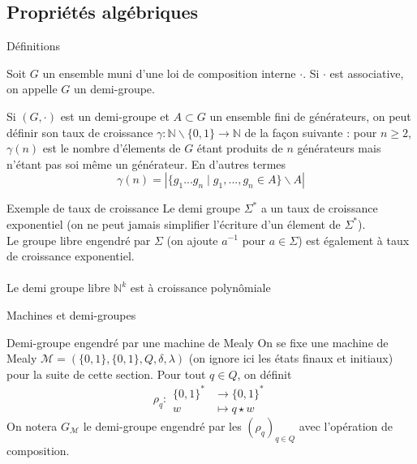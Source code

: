 \documentclass{beamer}
\begin{document}
\subsection{Propriétés algébriques}

\begin{frame}{Définitions}
    \begin{definition}
        Soit $G$ un ensemble muni d'une loi de composition interne $\cdot$. Si $\cdot$ est associative, on appelle $G$ un demi-groupe.
    \end{definition}
    
    \begin{definition}
        Si $(G, \cdot)$ est un demi-groupe et $A \subset G$ un ensemble fini de générateurs, on peut définir son taux de croissance
        $\gamma : \mathbb{N} \backslash \{0, 1\} \rightarrow \mathbb{N}$ de la façon suivante : pour $n \geq 2$, $\gamma(n)$ est le nombre d'élements
        de $G$ étant produits de $n$ générateurs mais n'étant pas soi même un générateur. En d'autres termes
        \[ \gamma(n) = |\{ g_1 ... g_n \mid g_1, ..., g_n \in A \} \backslash A| \]
    \end{definition}
\end{frame}

\begin{frame}{Exemple de taux de croissance}
    Le demi groupe $\Sigma^*$ a un taux de croissance exponentiel (on ne peut jamais simplifier l'écriture d'un élement de $\Sigma^*$).\\
    Le groupe libre engendré par $\Sigma$ (on ajoute $a^{-1}$ pour $a \in \Sigma$) est également à taux de croissance exponentiel.
    \\~\\
    Le demi groupe libre $\mathbb{N}^k$ est à croissance polynômiale
\end{frame}

\begin{frame}{Machines et demi-groupes}
    \begin{definition}{Demi-groupe engendré par une machine de Mealy}
    On se fixe une machine de Mealy $\mathcal{M} = (\{0, 1\}, \{0, 1\}, Q, \delta, \lambda)$ (on ignore ici les états finaux et initiaux)
    pour la suite de cette section. Pour tout $q \in Q$, on définit
    \[ \rho_q : \begin{array}{cl}
        \{0, 1\}^* &\longrightarrow \{0, 1\}^*\\
        w &\longmapsto q \star w 
    \end{array} \]
    On notera $G_{\mathcal{M}}$ le demi-groupe engendré par les $(\rho_q)_{q \in Q}$ avec l'opération de composition.
\end{definition}
\end{frame}
\end{document}
